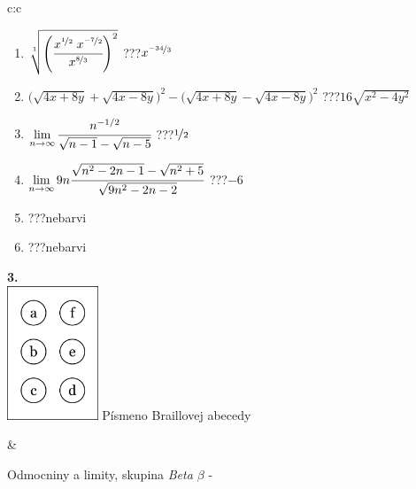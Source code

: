 \documentclass[10pt]{report}
\begin{document}
\begin{tabular}{c:c}
\begin{minipage}[c][104.5mm][t]{0.5\linewidth}
\begin{center}
\begin{minipage}{0.79\linewidth}
\begin{center}
\begin{varwidth}{\linewidth}
\begin{enumerate}
\small
\item $\sqrt[1]{\left(\cfrac{x^{\nicefrac{1}{2}}\;x^{\nicefrac{-7}{2}}}{x^{\nicefrac{8}{3}}}\right)^{2}}$\quad \dotfill\; ???\;\dotfill \quad $x^{\nicefrac{-34}{3}}$
\item {\footnotesize{\scriptsize$\big(\sqrt{4x+8y}+\sqrt{4x-8y}\big)^2-\big(\sqrt{4x+8y}-\sqrt{4x-8y}\big)^2$}\quad \dotfill\; ???\;\dotfill \quad $16\sqrt{x^2-4y^2}$}
\item $\lim\limits_{n\to\infty}\cfrac{n^{-1/2}}{\sqrt{n-1}-\sqrt{n-5}}$\quad \dotfill\; ???\;\dotfill \quad $\nicefrac{1}{2}$
\item $\lim\limits_{n\to\infty}9n\cfrac{\sqrt{n^2-2n-1}-\sqrt{n^2+5}}{\sqrt{9n^2-2n-2}}$\quad \dotfill\; ???\;\dotfill \quad $-6$
\item \quad \dotfill\; ???\;\dotfill \quad nebarvi
\item \quad \dotfill\; ???\;\dotfill \quad nebarvi
\end{enumerate}
\end{varwidth}
\end{center}
\end{minipage}
\begin{minipage}{0.20\linewidth}
\begin{center}
{\Huge\bfseries 3.} \\[2mm]
\includegraphics[height=40mm]{../images/braille.png}
{\small Písmeno Braillovej abecedy}
\end{center}
\end{minipage}
\end{center}
\end{minipage}
&
\begin{minipage}[c][104.5mm][t]{0.5\linewidth}
\begin{center}
\vspace{7mm}
{\huge Odmocniny a limity, skupina \textit{Beta $\beta$} -}\\[5mm]

\end{center}
\end{minipage}
\end{tabular}
\end{document}
